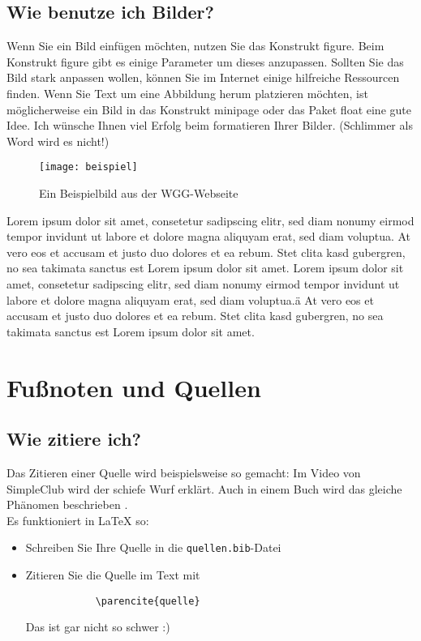 \documentclass{article}
\begin{document}
    \subsection{Wie benutze ich Bilder?}
    Wenn Sie ein Bild einfügen möchten, nutzen Sie das Konstrukt figure. Beim Konstrukt figure gibt es einige Parameter um dieses anzupassen.
    Sollten Sie das Bild stark anpassen wollen, können Sie im Internet einige hilfreiche Ressourcen finden.
    Wenn Sie Text um eine Abbildung herum platzieren möchten, ist möglicherweise ein Bild in das Konstrukt minipage oder das Paket float eine gute Idee.
    Ich wünsche Ihnen viel Erfolg beim formatieren Ihrer Bilder. (Schlimmer als Word wird es nicht!)\\
    \begin{figure}[H]
        \texttt{[image: beispiel]}
        \caption{Ein Beispielbild aus der WGG-Webseite \parencite{wggwallpaper}}
        \label{wallpaper}
    \end{figure}
    Lorem ipsum dolor sit amet, consetetur sadipscing elitr, sed diam nonumy eirmod tempor invidunt ut labore et dolore magna aliquyam erat, sed diam voluptua.
    At vero eos et accusam et justo duo dolores et ea rebum.
    Stet clita kasd gubergren, no sea takimata sanctus est Lorem ipsum dolor sit amet.
    Lorem ipsum dolor sit amet, consetetur sadipscing elitr, sed diam nonumy eirmod tempor invidunt ut labore et dolore magna aliquyam erat, sed diam voluptua.ä
    At vero eos et accusam et justo duo dolores et ea rebum. Stet clita kasd gubergren, no sea takimata sanctus est Lorem ipsum dolor sit amet.
    \newpage



    \section{Fußnoten und Quellen}
    \subsection{Wie zitiere ich?}
    Das Zitieren einer Quelle wird beispielsweise so gemacht: Im Video von SimpleClub \parencite{simpleclub} wird der schiefe Wurf erklärt.
    Auch in einem Buch wird das gleiche Phänomen beschrieben \parencite[vgl.][]{ruprecht} . \\
    Es funktioniert in \LaTeX{} so:
    \begin{itemize}
        \item Schreiben Sie Ihre Quelle in die \texttt{quellen.bib}-Datei
        \item Zitieren Sie die Quelle im Text mit \begin{verbatim}
            \parencite{quelle}
        \end{verbatim}
        Das ist gar nicht so schwer :)
    \end{itemize}
\end{document}
